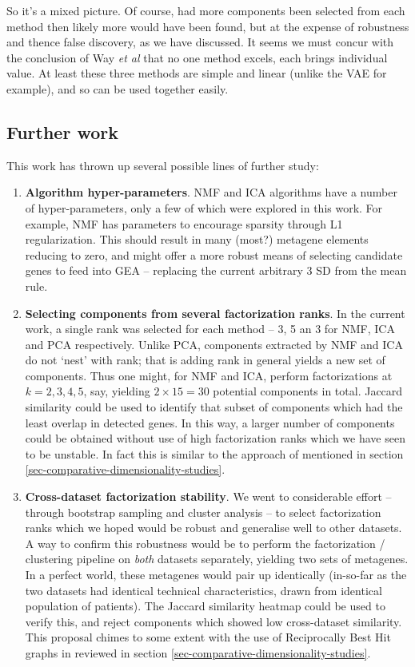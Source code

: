 \documentclass[tikz, 12pt,a4paper,oneside,fleqn]{article}
\newcommand{\etal}{{\em et al\/}}
\begin{document}
So it's a mixed picture.  Of course, had more components been selected from each method then likely more would have been found, but at the expense of robustness and thence false discovery, as we have discussed.   It seems we must concur with the conclusion of Way \etal \cite{WayGregory2019} that no one method excels, each brings individual value.   At least these three methods are simple and linear (unlike the VAE for example), and so can be used together easily.


\subsection{Further work}

This work has thrown up several possible lines of further study:
\begin{enumerate}
\item
{\bf Algorithm hyper-parameters}.  NMF and ICA algorithms have a number of hyper-parameters, only a few of which were explored in this work.  For example, NMF has parameters to encourage sparsity through L1 regularization.   This should result in many (most?) metagene elements reducing to zero, and might offer a more robust means of selecting candidate genes to feed into GEA -- replacing the current arbitrary 3 SD from the mean rule.
\item
{\bf Selecting components from several factorization ranks}.
In the current work, a single rank was selected for each method -- 3, 5 an 3 for NMF, ICA and PCA respectively.  Unlike PCA, components extracted by NMF and ICA  do not `nest' with rank; that is adding rank in general yields a new set of components.  Thus one might, for NMF and ICA, perform factorizations at $k=2,3,4,5$, say, yielding $2 \times 15 = 30$ potential components in total.  Jaccard similarity could be used to identify that subset of components which had the least overlap in detected genes.   In this way, a larger number of components could be obtained without use of high factorization ranks which we have seen to be unstable.  In fact this is similar to the approach of \cite{WayGregory2019} mentioned in section \ref{sec-comparative-dimensionality-studies}.
\item
{\bf Cross-dataset factorization stability}.  We went to considerable effort -- through bootstrap sampling and cluster analysis -- to select factorization ranks which we hoped would be robust and generalise well to other datasets.   A way to confirm this robustness would be to perform the factorization / clustering pipeline on \emph{both} datasets separately, yielding two sets of metagenes.  In a perfect world, these metagenes would pair up identically (in-so-far as the two datasets had identical technical characteristics, drawn from identical population of patients).  The Jaccard similarity heatmap could be used to verify this, and reject components which showed low cross-dataset similarity.  This proposal chimes to some extent with the use of Reciprocally Best Hit graphs in \cite{Cantini2019} reviewed in section \ref{sec-comparative-dimensionality-studies}.

\end{enumerate}
\end{document}
